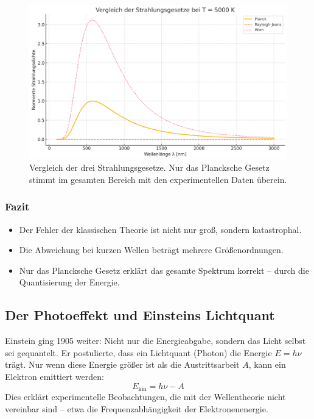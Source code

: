 \begin{figure}[H]
	\centering
	\includegraphics[width=0.85\linewidth]{bilder/strahlungsgesetze.png}
	\caption{Vergleich der drei Strahlungsgesetze. Nur das Plancksche Gesetz stimmt im gesamten Bereich mit den experimentellen Daten überein.}
	\label{fig:strahlungsgesetze}
\end{figure}

\subsubsection{Fazit}

\begin{itemize}
	\item Der Fehler der klassischen Theorie ist nicht nur groß, sondern katastrophal.
	\item Die Abweichung bei kurzen Wellen beträgt mehrere Größenordnungen.
	\item Nur das Plancksche Gesetz erklärt das gesamte Spektrum korrekt – durch die Quantisierung der Energie.
\end{itemize}

\subsection{Der Photoeffekt und Einsteins Lichtquant}

Einstein ging 1905 weiter: Nicht nur die Energieabgabe, sondern das Licht selbst sei gequantelt. Er postulierte, dass ein Lichtquant (Photon) die Energie \( E = h\nu \) trägt. Nur wenn diese Energie größer ist als die Austrittsarbeit \( A \), kann ein Elektron emittiert werden:  
\[
E_{\text{kin}} = h\nu - A
\]
Dies erklärt experimentelle Beobachtungen, die mit der Wellentheorie nicht vereinbar sind – etwa die Frequenzabhängigkeit der Elektronenenergie.

